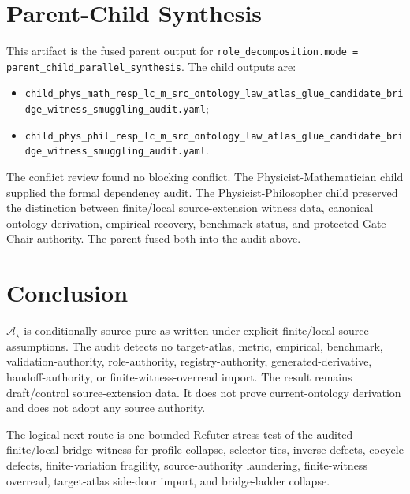 \documentclass[11pt]{article}
\newcommand{\Astar}{\mathcal A_{\star}}
\begin{document}
\section{Parent-Child Synthesis}

This artifact is the fused parent output for
\texttt{role\_decomposition.mode = parent\_child\_parallel\_synthesis}. The
child outputs are:
\begin{itemize}
  \item \texttt{child\_phys\_math\_resp\_lc\_m\_src\_ontology\_law\_atlas\_glue\_candidate\_bridge\_witness\_smuggling\_audit.yaml};
  \item \texttt{child\_phys\_phil\_resp\_lc\_m\_src\_ontology\_law\_atlas\_glue\_candidate\_bridge\_witness\_smuggling\_audit.yaml}.
\end{itemize}
The conflict review found no blocking conflict. The
Physicist-Mathematician child supplied the formal dependency audit. The
Physicist-Philosopher child preserved the distinction between finite/local
source-extension witness data, canonical ontology derivation, empirical
recovery, benchmark status, and protected Gate Chair authority. The parent
fused both into the audit above.

\section{Conclusion}

\(\Astar\) is conditionally source-pure as written under explicit finite/local
source assumptions. The audit detects no target-atlas, metric, empirical,
benchmark, validation-authority, role-authority, registry-authority,
generated-derivative, handoff-authority, or finite-witness-overread import.
The result remains draft/control source-extension data. It does not prove
current-ontology derivation and does not adopt any source authority.

The logical next route is one bounded Refuter stress test of the audited
finite/local bridge witness for profile collapse, selector ties, inverse
defects, cocycle defects, finite-variation fragility, source-authority
laundering, finite-witness overread, target-atlas side-door import, and
bridge-ladder collapse.
\end{document}
